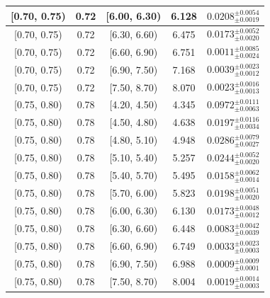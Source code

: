 \begin{longtable}{|c|c|c|c|c|}
\hline
[0.70, 0.75) & 0.72 & [6.00, 6.30) & 6.128 & $0.0208^{ \pm 0.0054 }_{ \pm 0.0019 }$ \\ 
\hline
[0.70, 0.75) & 0.72 & [6.30, 6.60) & 6.475 & $0.0173^{ \pm 0.0052 }_{ \pm 0.0020 }$ \\ 
\hline
[0.70, 0.75) & 0.72 & [6.60, 6.90) & 6.751 & $0.0011^{ \pm 0.0085 }_{ \pm 0.0024 }$ \\ 
\hline
[0.70, 0.75) & 0.72 & [6.90, 7.50) & 7.168 & $0.0039^{ \pm 0.0023 }_{ \pm 0.0012 }$ \\ 
\hline
[0.70, 0.75) & 0.72 & [7.50, 8.70) & 8.070 & $0.0023^{ \pm 0.0016 }_{ \pm 0.0013 }$ \\ 
\hline
[0.75, 0.80) & 0.78 & [4.20, 4.50) & 4.345 & $0.0972^{ \pm 0.0111 }_{ \pm 0.0063 }$ \\ 
\hline
[0.75, 0.80) & 0.78 & [4.50, 4.80) & 4.638 & $0.0197^{ \pm 0.0116 }_{ \pm 0.0034 }$ \\ 
\hline
[0.75, 0.80) & 0.78 & [4.80, 5.10) & 4.948 & $0.0286^{ \pm 0.0079 }_{ \pm 0.0027 }$ \\ 
\hline
[0.75, 0.80) & 0.78 & [5.10, 5.40) & 5.257 & $0.0244^{ \pm 0.0052 }_{ \pm 0.0020 }$ \\ 
\hline
[0.75, 0.80) & 0.78 & [5.40, 5.70) & 5.495 & $0.0158^{ \pm 0.0062 }_{ \pm 0.0014 }$ \\ 
\hline
[0.75, 0.80) & 0.78 & [5.70, 6.00) & 5.823 & $0.0198^{ \pm 0.0051 }_{ \pm 0.0020 }$ \\ 
\hline
[0.75, 0.80) & 0.78 & [6.00, 6.30) & 6.130 & $0.0173^{ \pm 0.0048 }_{ \pm 0.0012 }$ \\ 
\hline
[0.75, 0.80) & 0.78 & [6.30, 6.60) & 6.448 & $0.0083^{ \pm 0.0042 }_{ \pm 0.0039 }$ \\ 
\hline
[0.75, 0.80) & 0.78 & [6.60, 6.90) & 6.749 & $0.0033^{ \pm 0.0023 }_{ \pm 0.0003 }$ \\ 
\hline
[0.75, 0.80) & 0.78 & [6.90, 7.50) & 6.988 & $0.0009^{ \pm 0.0009 }_{ \pm 0.0001 }$ \\ 
\hline
[0.75, 0.80) & 0.78 & [7.50, 8.70) & 8.004 & $0.0019^{ \pm 0.0014 }_{ \pm 0.0003 }$ \\ 
\hline
\end{longtable}
\endgroup
